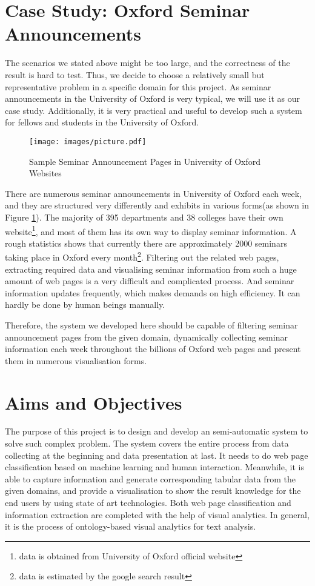 \section{Case Study: Oxford Seminar Announcements}

The scenarios we stated above might be too large, and the correctness of the result is hard to test. Thus, we decide to choose a relatively small but representative problem in a specific domain for this project. As seminar announcements in the University of Oxford is very typical, we will use it as our case study. Additionally, it is very practical and useful to develop such a system for fellows and students in the University of Oxford.

\begin{figure}[htb!]
	\centering
	\texttt{[image: images/picture.pdf]}
	\caption{Sample Seminar Announcement Pages in University of Oxford Websites}\label{fig:emp:various_layout}
\end{figure}

There are numerous seminar announcements in University of Oxford each week, and they are structured very differently and exhibits in various forms(as shown in Figure \ref{fig:emp:various_layout}). The majority of 395 departments and 38 colleges have their own website\footnote{data is obtained from University of Oxford official website}, and most of them has its own way to display seminar information. A rough statistics shows that currently there are approximately 2000 seminars taking place in Oxford every month\footnote{data is estimated by the google search result}. Filtering out the related web pages, extracting required data and visualising seminar information from such a huge amount of web pages is a very difficult and complicated process. And seminar information updates frequently, which makes demands on high efficiency. It can hardly be done by human beings manually. 

Therefore, the system we developed here should be capable of filtering seminar announcement pages from the given domain, dynamically collecting seminar information each week throughout the billions of Oxford web pages and present them in numerous visualisation forms.

\section{Aims and Objectives}
The purpose of this project is to design and develop an semi-automatic system to solve such complex problem. The system covers the entire process from data collecting at the beginning and data presentation at last. It needs to do web page classification based on machine learning and human interaction. Meanwhile, it is able to capture information and generate corresponding tabular data from the given domains, and provide a visualisation to show the result knowledge for the end users by using state of art technologies. Both web page classification and information extraction are completed with the help of visual analytics. In general, it is the process of ontology-based visual analytics for text analysis.

